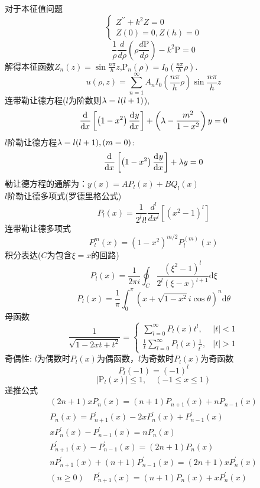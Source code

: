 \documentclass[UTF8,8pt]{ctexart}
\begin{document}
\begin{multicols}{2}
$$    $$
    对于本征值问题$$ 
    \left\{\begin{array}{l}{Z^{\prime \prime}+k^{2} Z=0} \\ {Z(0)=0, Z(h)=0}\end{array}\right.
    $$$$ 
    \frac{1}{\rho} \frac{d}{d \rho}\left(\rho \frac{d \mathrm{P}}{d \rho}\right)-k^{2} \mathrm{P}=0
    $$
    解得本征函数$Z_{n}(z)=\sin \frac{n \pi}{h} z$,$\mathrm{P}_{n}(\rho)=I_{0}\left(\frac{n \pi}{h} \rho\right)$.$$ 
    u(\rho, z)=\sum_{n=1}^{\infty} A_{n} I_{0}\left(\frac{n \pi}{h} \rho\right) \sin \frac{n \pi}{h} z
    $$
    连带勒让德方程($l$为阶数则$\lambda=l(l+1)$),$$ 
    \frac{\mathrm{d}^{} }{\mathrm{d} {x}^{}}\left[\left(1-x^{2}\right) \frac{\mathrm{d}^{} y}{\mathrm{d} {x}^{}}\right]+\left(\lambda-\frac{m^{2}}{1-x^{2}}\right) y=0
    $$
    $l$阶勒让德方程$\lambda=l(l+1),(m=0)$:$$ 
    \frac{\mathrm{d}^{} }{\mathrm{d} {x}^{}}\left[\left(1-x^{2}\right) \frac{\mathrm{d}^{} y}{\mathrm{d} {x}^{}}\right]+\lambda  y=0
    $$勒让德方程的通解为：$y(x)=A P_{l}(x)+B Q_{l}(x)$\\
    $l$阶勒让德多项式(罗德里格公式)$$P_{l}(x)=\frac{1}{2^{l} l !} \frac{d^{l}}{d x^{l}}[\left(x^{2}-1\right)^{l}]$$
    连带勒让德多项式$$P_l^m(x)=(1-x^2)^{m/2}P_l^{(m)}(x)$$
    积分表达($C$为包含$\xi=x$的回路)
    $$ 
    P_{l}(x)=\frac{1}{2 \pi i}\oint_C\frac{\left(\xi^{2}-1\right)^{l}}{2^{l}(\xi-x)^{l+1}} \mathrm{d} \xi
    $$
    $$ 
    P_{l}(x)=\frac{1}{\pi} \int_{0}^{\pi}\left(x+\sqrt{1-x^{2}} i \cos \theta\right)^{n} \mathrm{d} \theta
    $$
    母函数
    $$ 
    \frac{1}{\sqrt{1-2 x t+t^{2}}}=\left\{\begin{array}{ll}{\sum_{l=0}^{\infty} P_{l}(x) t^{l},} & {|t|<1} \\ {\frac{1}{t} \sum_{l=0}^{\infty} P_{l}(x) \frac{1}{t^{\prime}},} & {|t|>1}\end{array}\right.
    $$
    奇偶性: $l$为偶数时$P_l(x)$为偶函数，$l$为奇数时$P_l(x)$为奇函数
    $$P_{l}(-1)=(-1)^{l}$$
    $$ 
    \left|\mathrm{P}_{l}(x)\right| \leq 1, \quad(-1 \leq x \leq 1)
    $$递推公式$$ 
    \begin{array}{l}{(2 n+1) x P_{n}(x)=(n+1) P_{n+1}(x)+n P_{n-1}(x)} \\ {P_{n}(x)=P_{n+1}^{\prime}(x)-2 x P_{n}^{\prime}(x)+P_{n-1}^{\prime}(x)} \\ {x P_{n}^{\prime}(x)-P_{n-1}^{\prime}(x)=n P_{n}(x)} \\ {P_{n+1}^{\prime}(x)-P_{n-1}^{\prime}(x)=(2 n+1) P_{n}(x)} \\ {n P_{n+1}^{\prime}(x)+(n+1) P_{n-1}^{\prime}(x)=(2 n+1) x P_{n}^{\prime}(x)} \\ {(n \geq 0) \quad P_{n+1}^{\prime}(x)=(n+1) P_{n}(x)+x P_{n}^{\prime}(x)}\end{array}
$$
\end{multicols}
\end{document}
